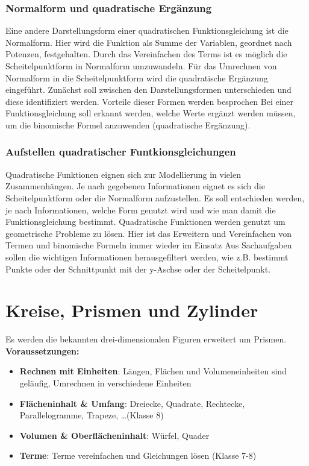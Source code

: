 \documentclass{article}
\begin{document}
\subsubsection*{Normalform und quadratische Ergänzung}
Eine andere Darstellungsform einer quadratischen Funktionsgleichung ist die Normalform. Hier wird die Funktion als Summe der Variablen, geordnet nach Potenzen, festgehalten.
Durch das Vereinfachen des Terms ist es möglich die Scheitelpunktform in Normalform umzuwandeln.
Für das Umrechnen von Normalform in die Scheitelpunktform wird die quadratische Ergänzung eingeführt.
Zunächst soll zwischen den Darstellungsformen unterschieden und diese identifiziert werden. Vorteile dieser Formen werden besprochen
Bei einer Funktionsgleichung soll erkannt werden, welche Werte ergänzt werden müssen, um die binomische Formel anzuwenden (quadratische Ergänzung).
\subsubsection*{Aufstellen quadratischer Funtkionsgleichungen}
Quadratische Funktionen eignen sich zur Modellierung in vielen Zusammenhängen.
Je nach gegebenen Informationen eignet es sich die Scheitelpunktform oder die Normalform aufzustellen.
Es soll entschieden werden, je nach Informationen, welche Form genutzt wird und wie man damit die Funktionsgleichung bestimmt.
Quadratische Funktionen werden genutzt um geometrische Probleme zu lösen. Hier ist das Erweitern und Vereinfachen von Termen und binomische Formeln immer wieder im Einsatz
Aus Sachaufgaben sollen die wichtigen Informationen herausgefiltert werden, wie z.B. bestimmt Punkte oder der Schnittpunkt mit der y-Aschse oder der Scheitelpunkt.
\newpage
\section{Kreise, Prismen und Zylinder}
Es werden die bekannten drei-dimensionalen Figuren erweitert um Prismen.\\
\textbf{Voraussetzungen:}
\begin{itemize}
    \item \textbf{Rechnen mit Einheiten}: Längen, Flächen und Volumeneinheiten sind geläufig, Umrechnen in verschiedene Einheiten
    \item \textbf{Flächeninhalt \& Umfang}: Dreiecke, Quadrate, Rechtecke, Parallelogramme, Trapeze, \ldots  (Klasse 8)
    \item \textbf{Volumen \& Oberflächeninhalt}: Würfel, Quader 
    \item \textbf{Terme}: Terme vereinfachen und Gleichungen lösen (Klasse 7-8)
\end{itemize}
\end{document}
